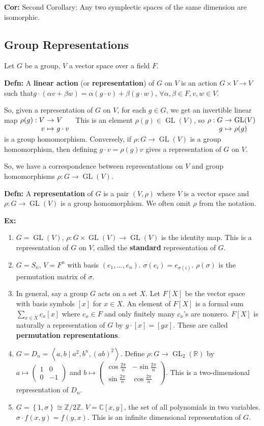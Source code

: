 \documentclass[10pt,letterpaper]{article}
\newcommand{\n}{\hfill\break}
\newcommand{\hangblock}[2]{\par\noindent\settowidth{\hangindent}{\textbf{#1: }}\textbf{#1: }\!\!\!#2}
\newcommand{\defn}[1]{\hangblock{Defn}{#1}}
\newcommand{\cor}[1]{\hangblock{Cor}{#1}}
\newcommand{\ex}[1]{\hangblock{Ex}{#1}}
\newcommand{\set}[1]{\left\{#1\right\}}
\newcommand{\integers}{\mathbb{Z}}
\newcommand{\Z}{\integers}
\newcommand{\reals}{\mathbb{R}}
\newcommand{\R}{\reals}
\newcommand{\complex}{\mathbb{C}}
\newcommand{\C}{\complex}
\newcommand{\map}[4]{\!\!\!\begin{array}[t]{rcl}#1 & \!\!\!\!\to & \!\!\!\!#2\\ #3 & \!\!\!\!\mapsto & \!\!\!\!#4\end{array}}
\DeclareMathOperator{\GL}{GL}
\newcommand{\smallPMatrix}[1]{\paren{\begin{smallmatrix}#1\end{smallmatrix}}}
\newcommand{\generated}[1]{\left<#1\right>}
\newcommand{\paren}[1]{\left(#1\right)}
\begin{document}
\cor{
	Second Corollary: Any two symplectic spaces of the same dimension are isomorphic.\n
}

\subsection*{Group Representations}

\par\noindent
Let $G$ be a group, $V$ a vector space over a field $F$.\n

\defn{
	A \textbf{linear action} (or \textbf{representation}) of $G$ on $V$ is an action $G\times{}V\to{}V$ such that\break $g\cdot(\alpha{}v+\beta{}w)=\alpha(g\cdot{}v)+\beta(g\cdot{}w)$, $\forall\alpha,\beta\in{}F,v,w\in{}V$.\n
}

\par\noindent
So, given a representation of $G$ on $V$, for each $g\in{}G$, we get an invertible linear map $\map{\rho(g):V}{V}{v}{g\cdot{}v}$\n
This is an element $\rho(g)\in\GL(V)$, so $\map{\rho:G}{\GL(V)}{g}{\rho(g)}$ is a group homomorphism.\n
Conversely, if $\rho:G\to\GL(V)$ is a group homomorphism, then defining $g\cdot{}v=\rho(g)v$ gives a representation of $G$ on $V$.\n

\par\noindent
So, we have a correspondence between representations on $V$ and group homomorphisms $\rho:G\to\GL(V)$.\n

\defn{
	A \textbf{representation} of $G$ is a pair $(V,\rho)$ where $V$ is a vector space and $\rho:G\to\GL(V)$ is a group homomorphism. We often omit $\rho$ from the notation.\n
}

\ex{
	\begin{enumerate}[leftmargin=3\parindent, topsep=0pt]
		\item $G=\GL(V)$, $\rho:G\times\GL(V)\to\GL(V)$ is the identity map.\n
		This is a representation of $G$ on $V$, called the \textbf{standard} representation of $G$.
		\item $G=S_{n}$, $V=F^{n}$ with basis $(e_{1},\ldots,e_{n})$. $\sigma(e_{i})=e_{\sigma(i)}$. $\rho(\sigma)$ is the permutation matrix of $\sigma$.
		\item In general, say a group $G$ acts on a set $X$. Let $F[X]$ be the vector space with basis symbols $[x]$ for $x\in{}X$. An element of $F[X]$ is a formal sum $\sum_{x\in{}X}c_{x}[x]$ where $c_{x}\in{}F$ and only finitely many $c_{x}$'s are nonzero. $F[X]$ is naturally a representation of $G$ by $g\cdot[x]=[gx]$. These are called \textbf{permutation representations}.
		\item $G=D_{n}=\generated{a,b\mid{}a^{2},b^{n},(ab)^{2}}$. Define $\rho:G\to\GL_{2}(\R)$ by $a\mapsto\smallPMatrix{1 & 0\\ 0 & -1}$ and $b\mapsto\smallPMatrix{\cos\frac{2\pi}{n} & -\sin\frac{2\pi}{n}\\ \sin\frac{2\pi}{n} & \cos\frac{2\pi}{n}}$.\n
		This is a two-dimensional representation of $D_{n}$.
		\item $G=\set{1,\sigma}\cong\Z/2\Z$. $V=\C[x,y]$, the set of all polynomials in two variables. $\sigma\cdot{}f(x,y)=f(y,x)$. This is an infinite dimensional representation of $G$.
	\end{enumerate}
}
\end{document}
